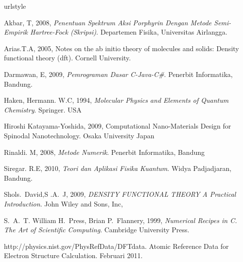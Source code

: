 %
% 
% 
\begin{thebibliography}{7}
%
\providecommand{\natexlab}[1]{#1}
\providecommand{\url}[1]{\texttt{#1}}
\expandafter\ifx\csname urlstyle\endcsname\relax
  \providecommand{\doi}[1]{doi: #1}\else
  \providecommand{\doi}{doi: \begingroup \urlstyle{rm}\Url}\fi

Akbar, T, 2008,
\newblock \emph{Penentuan Spektrum Aksi \textit{Porphyrin} Dengan Metode
  Semi-Empirik \textit{Hartree-Fock} (Skripsi)}.
\newblock Departemen Fisika, Universitas Airlangga.

Arias.T.A, 2005,
\newblock Notes on the ab initio theory of molecules and solids: Density
  functional theory (dft).
\newblock Cornell University.

Darmawan, E, 2009,
\newblock \emph{Pemrograman Dasar C-Java-C\#}.
\newblock Penerbit Informatika, Bandung.

Haken, Hermann. W.C, 1994,
\newblock \emph{{M}olecular {P}hysics and {E}lements of {Q}uantum {C}hemistry}.
\newblock Springer. USA

Hiroshi Katayama-Yoshida, 2009,
\newblock Computational Nano-Materials Design for Spinodal Nanotechnology.
\newblock Osaka University Japan

Rinaldi. M, 2008,
\newblock \emph{Metode Numerik}.
\newblock Penerbit Informatika, Bandung

Siregar. R.E, 2010,
\newblock \emph{Teori dan Aplikasi Fisika Kuantum}.
\newblock Widya Padjadjaran, Bandung.

Shols.~David,S .A.~J, 2009,
\newblock \emph{{D}ENSITY {F}UNCTIONAL {T}HEORY A {P}ractical {I}ntroduction}.
\newblock John Wiley and Sons, Inc,

S.~A.~T. William H.~Press, Brian P.~Flannery, 1999, 
\newblock \emph{{N}umerical {R}ecipes in {C}. {T}he {A}rt of {S}cientific
  {C}omputing}.
\newblock Cambridge University Press.


http://physics.nist.gov/PhysRefData/DFTdata.
\newblock Atomic Reference Data for Electron Structure Calculation.
 Februari 2011.


\end{thebibliography}

